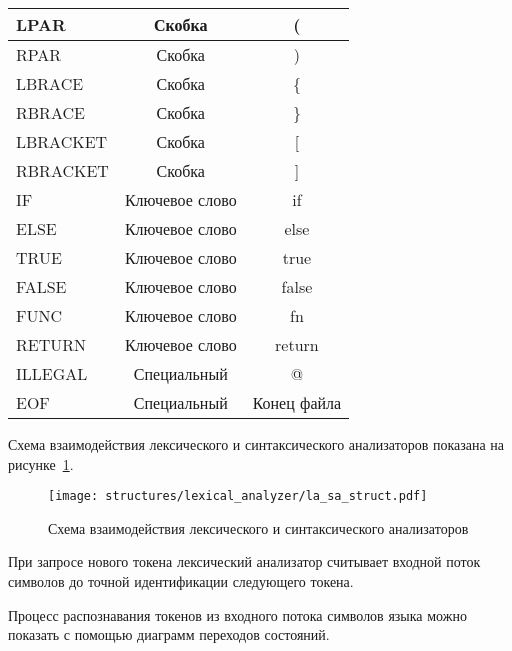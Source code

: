 \begin{table}[h!]
\begin{tabularx}{\textwidth}{|X|c|c|}
        \hline
        LPAR          & Скобка         & (               \\
        \hline
        RPAR          & Скобка         & )               \\
        \hline
        LBRACE        & Скобка         & \{              \\
        \hline
        RBRACE        & Скобка         & \}              \\
        \hline
        LBRACKET      & Скобка         & [               \\
        \hline
        RBRACKET      & Скобка         & ]               \\
        \hline
        IF            & Ключевое слово & if              \\
        \hline
        ELSE          & Ключевое слово & else            \\
        \hline
        TRUE          & Ключевое слово & true            \\
        \hline
        FALSE         & Ключевое слово & false           \\
        \hline
        FUNC          & Ключевое слово & fn              \\
        \hline
        RETURN        & Ключевое слово & return          \\
        \hline
        ILLEGAL       & Специальный    & @               \\
        \hline
        EOF           & Специальный    & Конец файла     \\
        \hline
    \end{tabularx}
    \vspace{\bottompaddingoftable}
\end{table}

Схема взаимодействия лексического и синтаксического анализаторов показана на рисунке~\ref{f:la_sa_struct}.

\begin{figure}[ht]
	\centering
	\vspace{\toppaddingoffigure}
	\texttt{[image: structures/lexical\_analyzer/la\_sa\_struct.pdf]}
	\caption{Схема взаимодействия лексического и синтаксического анализаторов}
	\label{f:la_sa_struct}
\end{figure}

При запросе нового токена лексический анализатор считывает входной поток символов до точной идентификации следующего токена.

Процесс распознавания токенов из входного потока символов языка можно показать с помощью диаграмм переходов состояний.

